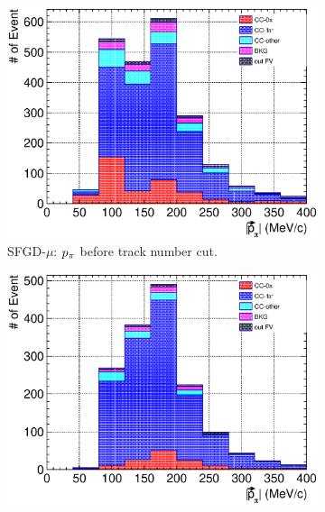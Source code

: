 \begin{figure}[ht]
\begin{subfigure}{\dbfigwid\textwidth}
                  \label{subfig:tlpi-tpi-af-trknumcut-tpc}
             \end{subfigure}
             \\
             \begin{subfigure}{\dbfigwid\textwidth}
                  \includegraphics[width=\textwidth]{figures/sel/SFGmu_p_pi_stack_al8.eps}
                  \caption{SFGD-$\mu$: $p_{\pi}$ before track number cut.}
                  \label{subfig:tlpi-ppi-bf-trknumcut-sfg}
             \end{subfigure}
             \begin{subfigure}{\dbfigwid\textwidth}
                  \includegraphics[width=\textwidth]{figures/sel/SFGmu_p_pi_stack_al9.eps}

\end{subfigure}
\end{figure}
